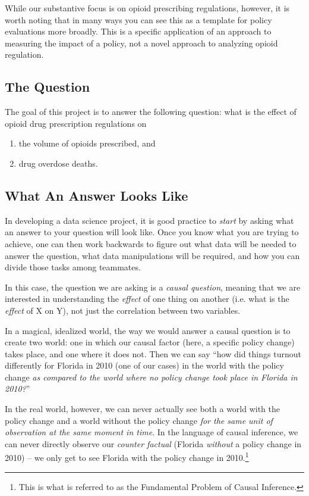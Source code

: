\documentclass[12pt]{article}
\begin{document}
While our substantive focus is on opioid prescribing regulations, however, it is worth noting that in many ways you can see this as a template for policy evaluations more broadly. This is a specific application of an approach to measuring the impact of a policy, not a novel approach to analyzing opioid regulation.

\subsection*{The Question}

The goal of this project is to answer the following question: what is the effect of opioid drug prescription regulations on

\begin{enumerate}
  \item the volume of opioids prescribed, and
  \item drug overdose deaths.
\end{enumerate}

\subsection*{What An Answer Looks Like}

In developing a data science project, it is good practice to \emph{start} by asking what an answer to your question will look like. Once you know what you are trying to achieve, one can then work backwards to figure out what data will be needed to answer the question, what data manipulations will be required, and how you can divide those tasks among teammates.

In this case, the question we are asking is a \emph{causal question}, meaning that we are interested in understanding the \emph{effect} of one thing on another (i.e. what is the \emph{effect} of X on Y), not just the correlation between two variables.

In a magical, idealized world, the way we would answer a causal question is to create two world: one in which our causal factor (here, a specific policy change) takes place, and one where it does not. Then we can say ``how did things turnout differently for Florida in 2010 (one of our cases) in the world with the policy change \emph{as compared to the world where no policy change took place in Florida in 2010?}''

In the real world, however, we can never actually see both a world with the policy change and a world without the policy change \emph{for the same unit of observation at the same moment in time}. In the language of causal inference, we can never directly observe our \emph{counter factual} (Florida \emph{without} a policy change in 2010) -- we only get to see Florida with the policy change in 2010.\footnote{This is what is referred to as the Fundamental Problem of Causal Inference.}
\end{document}
